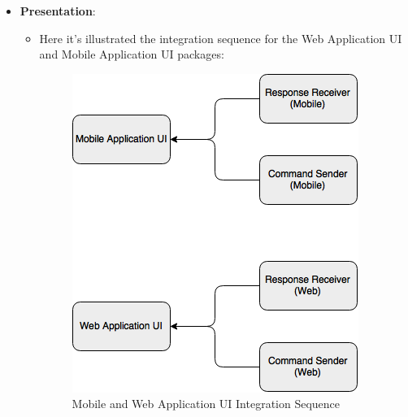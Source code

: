 \documentclass[../../../../../../testPlan.tex]{subfiles}
\begin{document}
\begin{itemize}
			\item \textbf{Presentation}:
					\begin{itemize}
						\item Here it's illustrated the integration sequence for the Web Application UI and Mobile Application UI packages:
							\begin{figure}[H]
								\centering
								\includegraphics[width=\textwidth, scale=0.5]{../images/priority_presentation.png}
								\caption{Mobile and Web Application UI Integration Sequence}\label{fig:UISequence}
							\end{figure}
					\end{itemize}
		\end{itemize}
	
	 
\end{document}
